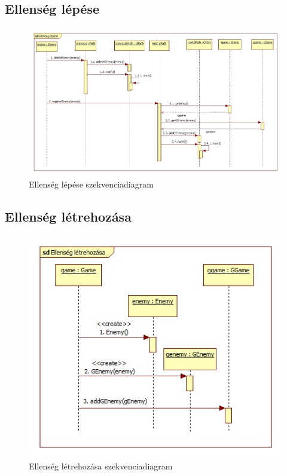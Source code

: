 \subsection{Ellenség lépése}
\begin{figure}[H]
\begin{center}
\includegraphics[width=17cm]{chapters/chapter11/images/Ellenseg_lepese.jpg}
\caption{Ellenség lépése szekvenciadiagram}
\label{fig:Ellenseg_lepese}
\end{center}
\end{figure}

\subsection{Ellenség létrehozása}
\begin{figure}[H]
\begin{center}
\includegraphics[width=17cm]{chapters/chapter11/images/Ellenseg_letrehozasa.jpg}
\caption{Ellenség létrehozása szekvenciadiagram}
\label{fig:Ellenseg_letrehozasa}
\end{center}
\end{figure}

